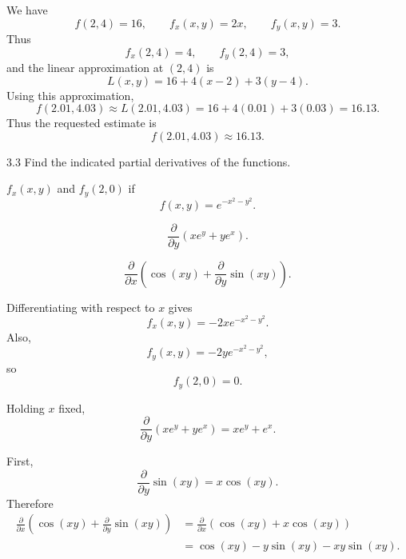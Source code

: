 \documentclass[11pt,oneside]{article}
\begin{document}
\begin{solution}
We have
\[
    f(2,4)=16,
    \qquad
    f_x(x,y)=2x,
    \qquad
    f_y(x,y)=3.
\]
Thus
\[
    f_x(2,4)=4,
    \qquad
    f_y(2,4)=3,
\]
and the linear approximation at $(2,4)$ is
\[
    \boxed{L(x,y)=16+4(x-2)+3(y-4)}.
\]
Using this approximation,
\[
    f(2.01,4.03)
    \approx L(2.01,4.03)
    =16+4(0.01)+3(0.03)
    =16.13.
\]
Thus the requested estimate is
\[
    \boxed{f(2.01,4.03)\approx16.13}.
\]
\end{solution}

\begin{problem}{3.3}
Find the indicated partial derivatives of the functions.
\begin{problemsubparts}
    \item $f_x(x,y)$ and $f_y(2,0)$ if
    \[
        f(x,y)=e^{-x^2-y^2}.
    \]
    \item
    \[
        \frac{\partial}{\partial y}\left(xe^y+ye^x\right).
    \]
    \item
    \[
        \frac{\partial}{\partial x}
        \left(
            \cos(xy)+\frac{\partial}{\partial y}\sin(xy)
        \right).
    \]
\end{problemsubparts}
\end{problem}

\begin{solution}
\begin{problemsubparts}
    \item Differentiating with respect to $x$ gives
    \[
        \boxed{f_x(x,y)=-2xe^{-x^2-y^2}}.
    \]
    Also,
    \[
        f_y(x,y)=-2ye^{-x^2-y^2},
    \]
    so
    \[
        \boxed{f_y(2,0)=0}.
    \]

    \item Holding $x$ fixed,
    \[
        \boxed{
        \frac{\partial}{\partial y}\left(xe^y+ye^x\right)
        =xe^y+e^x
        }.
    \]

    \item First,
    \[
        \frac{\partial}{\partial y}\sin(xy)=x\cos(xy).
    \]
    Therefore
    \begin{align*}
        \frac{\partial}{\partial x}
        \left(
            \cos(xy)+\frac{\partial}{\partial y}\sin(xy)
        \right)
        &=\frac{\partial}{\partial x}\left(\cos(xy)+x\cos(xy)\right)\\
        &=\boxed{\cos(xy)-y\sin(xy)-xy\sin(xy)}.
    \end{align*}
\end{problemsubparts}
\end{solution}
\end{document}
